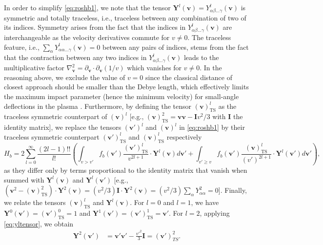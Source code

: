 In order to simplify \cref{eq:roshb1}, we note that the tensor $\mathbf Y^{l}(\mathbf v)=Y_{\alpha \beta ... \gamma}^l(\mathbf v)$ is symmetric and totally traceless, i.e., traceless between any combination of two of its indices.
%
Symmetry arises from the fact that the indices in $Y_{\alpha \beta ... \gamma}^l(\mathbf v)$ are interchangeable as the velocity derivatives commute for $v \not= 0$.
%
The traceless feature, i.e., $\sum_\alpha Y_{\alpha \alpha ... \gamma}^l(\mathbf v)=0$ between any pairs of indices, stems from the fact that the contraction between any two indices in $Y_{\alpha \beta ... \gamma}^l(\mathbf v)$ leads to the multiplicative factor $\nabla_{\mathbf v}^2=\partial_{\mathbf v}\cdot \partial_{\mathbf v} (1/v)$ which vanishes for $v\not=0$.
%
In the reasoning above, we exclude the value of $v=0$ since the classical distance of closest approach should be smaller than the Debye length, which effectively limits the maximum impact parameter (hence the minimum velocity) for small-angle deflections in the plasma \citep{Li2011}.
%
Furthermore, by defining the tensor $(\mathbf v)^l_{\text{TS}}$ as the traceless symmetric counterpart of $(\mathbf v)^l$ [e.g., $(\mathbf v)^2_{\text{TS}}=\mathbf v \mathbf v - \mathbf I v^2/3$ with $\mathbf I$ the identity matrix], we replace the tensors $(\mathbf v')^l$ and $(\mathbf v)^l$ in \cref{eq:roshb1} by their traceless symmetric counterpart $(\mathbf v')^l_{\text{TS}}$ and $(\mathbf v)^l_{\text{TS}}$ respectively
%
\begin{equation}
    H_b = 2 \sum_{l=0}^\infty \frac{(2l-1)!!}{l!} \left(\int_{v>v'} f_b(\mathbf v') \frac{(\mathbf v')^l_{\text{TS}}}{v^{2l+1}} \cdot \mathbf Y^{l}(\mathbf v)  d\mathbf v'+\int_{v'\ge v} f_b(\mathbf v') \frac{(\mathbf v)^l_{\text{TS}}}{(v')^{2l+1}} \cdot \mathbf Y^{l}(\mathbf v')  d\mathbf v'\right),
\label{eq:roshb11}
\end{equation}
%
as they differ only by terms proportional to the identity matrix that vanish when summed with $\mathbf Y^{l}(\mathbf v)$ and $\mathbf Y^{l}(\mathbf v')$ [e.g., $(\mathbf v^2-(\mathbf v)^2_{\text{TS}})\cdot \mathbf Y^2(\mathbf v)=(v^2/3)\mathbf I \cdot \mathbf Y^2(\mathbf v)=(v^2/3) \sum_\alpha Y^2_{\alpha \alpha} =0$].
%
Finally, we relate the tensors $(\mathbf v)^l_{\text{TS}}$ and $\mathbf Y^{l}(\mathbf v)$.
%
For $l=0$ and $l=1$, we have $\mathbf Y^{0}(\mathbf v')=(\mathbf v')^0_{\text{TS}}=1$ and $\mathbf Y^{1}(\mathbf v')=(\mathbf v')^1_{\text{TS}}=\mathbf v'$.
%
For $l=2$, applying \cref{eq:yltensor}, we obtain
%
\begin{equation}
\begin{split}
    \mathbf Y^2(\mathbf v') &= \mathbf v' \mathbf v' - \frac{v'^2}{3}\mathbf I=(\mathbf v')^2_{TS}.
\end{split}
\label{eq:yl2}
\end{equation}
